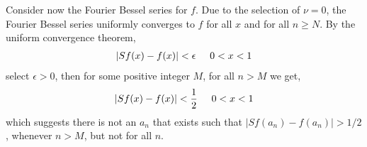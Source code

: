 \documentclass[a4paper]{article}
\newcommand{\ds}{\displaystyle}
\begin{document}
\begin{enumerate}
\begin{enumerate}
		\bigbreak 
		Consider now the Fourier Bessel series for $\ds{f}$. Due to the selection of $\ds{\nu = 0}$, the Fourier Bessel series uniformly converges to $\ds{f}$ for all $\ds{x}$ and for all $\ds{n \geq N}$. By the uniform convergence theorem,
		\begin{align*}
			|Sf(x) - f(x)| < \epsilon \hspace{5mm} 0<x<1\\
		\end{align*} 
		select $\ds{\epsilon > 0}$, then for some positive integer $\ds{M}$, for all $\ds{n>M}$ we get,
		\begin{align*}
			|Sf(x) - f(x)| < \frac{1}{2} \hspace{5mm} 0<x<1\\
		\end{align*} 
		which suggests there is not an $\ds{a_n}$ that exists such that $\ds{|Sf(a_n) -f(a_n)| > 1/2}$, whenever $\ds{n>M}$, but not for all $\ds{n}$.
	\end{enumerate}


\end{enumerate}
\end{document}
